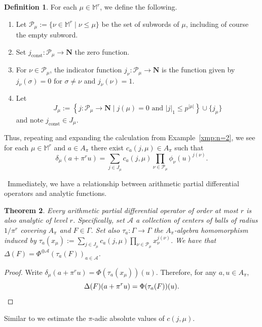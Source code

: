 \documentclass[10pt]{amsart}
\theoremstyle{Theorem}
\newtheorem{thm}{Theorem}[section]
\theoremstyle{definition}
\newtheorem{dff}[thm]{Definition}
\newcommand{\cA}{\mathcal{A}}
\begin{document}
\begin{dff}
For each $\mu \in \mathbb{M}^r$, we define the following. 
\begin{enumerate}
\item  Let $\mathcal{P}_\mu := \{ \nu \in \mathbb{M}^r \mid \nu \leq \mu \}$ be the set of subwords of $\mu$, including of course the empty subword. 
\item Set $j_{\text{const}} \colon \mathcal{P}_\mu \to \mathbf{N}$ the zero function. 
\item For $\nu\in\mathcal{P}_\mu$, the indicator function $j_\nu \colon \mathcal{P}_\mu \to \mathbf{N}$ is the function given by $j_\nu(\sigma)=0\text{ for }\sigma\neq \nu$ and $j_\nu(\nu) = 1$. 
\item Let $$J_\mu := \left\{j \colon \mathcal{P}_\mu\to \mathbf{N}\mid j(\mu)=0\text{ and } |j|_1\leq p^{|\mu|}\right\} \cup \{j_\mu\}$$ and note $j_{\text{const}} \in J_\mu$. 
\end{enumerate}
\end{dff} 

Thus, repeating and expanding the calculation from Example~\ref{xmp:n=2}, we see for each $\mu \in \mathbb{M}^r$ and $a \in A_\pi$ there exist $c_a(j,\mu)\in A_\pi$ such that \[\delta_\mu(a + \pi^r u) = \sum_{j\in J_\mu}c_a(j,\mu)\prod_{\nu\in \mathcal{P}_\mu}\phi_\nu(u)^{j(\nu)}.\] 

 \ 
Immediately, we have a relationship between arithmetic partial differential operators and analytic functions.

\begin{thm}\label{thm:PADOtoAnal} Every arithmetic partial differential operator of order at most $r$ is also analytic of level $r$. Specifically, set $\cA$ a collection of centers of balls of radius $1/\pi^r$ covering $A_\pi$ and $F\in \Gamma$. Set also $\tau_a \colon \Gamma\to \Gamma$ the $A_\pi$-algebra homomorphism induced by $\tau_a(x_\mu) := \sum_{j \in J_\mu} c_a(j,\mu) \prod_{\nu \in \mathcal{P}_\mu} x_\nu^{j(\nu)}$. We have that $\Delta(F) = \Phi^{\oplus \cA}(\tau_a(F))_{a\in \cA}$. 
\end{thm}

\begin{proof}
 Write $\delta_\mu(a+\pi^r u) = \Phi(\tau_a(x_\mu))(u)$.  Therefore, for any $a, u\in A_\pi$, 
\[	\Delta(F)(a+\pi^r u) = \Phi(\tau_a(F))(u).\qedhere\]
\end{proof}


Similar to \cite[Lem. 10]{BRS11} we estimate the $\pi$-adic absolute values of $c(j,\mu)$. 
\end{document}
